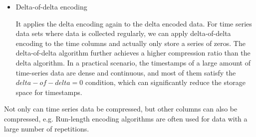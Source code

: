 \begin{itemize}
    
    \item Delta-of-delta encoding
    
    It applies the delta encoding again to the delta encoded data\cite{}. For time series data sets where data is collected regularly, we can apply delta-of-delta encoding to the time columns and actually only store a series of zeros\cite{lockerman_2022}. The delta-of-delta algorithm further achieves a higher compression ratio than the delta algorithm. In a practical scenario, the timestamps of a large amount of time-series data are dense and continuous, and most of them satisfy the $ delta-of-delta=0 $ condition, which can significantly reduce the storage space for timestamps\cite{10.14778/2824032.2824078}.
    
\end{itemize}

Not only can time series data be compressed, but other columns can also be compressed, e.g. Run-length encoding algorithms are often used for data with a large number of repetitions.

